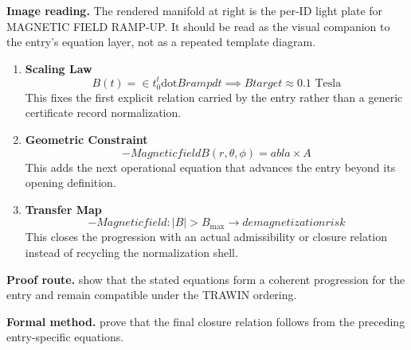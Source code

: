 \begin{samepage}
\noindent\begin{minipage}[t]{0.45\linewidth}
\vspace{0pt}
\raggedright
\scriptsize\textbf{Image reading.} The rendered manifold at right is the per-ID light plate for MAGNETIC FIELD RAMP-UP. It should be read as the visual companion to the entry's equation layer, not as a repeated template diagram.\par
\end{minipage}\hfill
\begin{minipage}[t]{0.53\linewidth}
\vspace*{-0.10in}
\raggedright
{}
\end{minipage}
\end{samepage}

\clearpage


\begin{enumerate}[leftmargin=1.6em,itemsep=9pt,topsep=6pt]
\item \textbf{Scaling Law}
\[
B(t) = \in t_0^t \mathrm{dot}{B} {ramp} dt \implies B {target} \approx 0.1 \text{ Tesla}
\]
This fixes the first explicit relation carried by the entry rather than a generic certificate record normalization.

\item \textbf{Geometric Constraint}
\[
- Magnetic field B(r,\theta,\phi) =  abla \times A
\]
This adds the next operational equation that advances the entry beyond its opening definition.

\item \textbf{Transfer Map}
\[
- Magnetic field: |B| > B_{\mathrm{max}} \to demagnetization risk
\]
This closes the progression with an actual admissibility or closure relation instead of recycling the normalization shell.
\end{enumerate}

\textbf{Proof route.} show that the stated equations form a coherent progression for the entry and remain compatible under the TRAWIN ordering.

\textbf{Formal method.} prove that the final closure relation follows from the preceding entry-specific equations.

\medskip
{}

